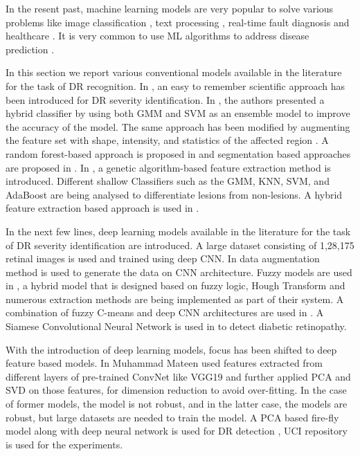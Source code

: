 \documentclass[electronics,article,accept ,moreauthors,pdftex]{mdpi}
\begin{document}
In the resent past, machine learning models are very popular to solve various problems like image classification \cite{bodapati2019feature}, text processing \cite{bodapati2019sentiment}, real-time fault diagnosis \cite{zhuo2018real} and healthcare \cite{xia2020ensemble, moreira2019comprehensive}. It is very common to use ML algorithms to address disease prediction \cite{gadekallu2020deep,patel2020review} \cite{reddy2019hybrid}. 

In this section we report various conventional models available in the literature for the task of DR recognition. In \cite{wu2013classification}, an easy to remember scientific approach has been introduced for DR severity identification. In \cite{akram2013identification}, the authors presented a hybrid classifier by using both GMM and SVM as an ensemble model to improve the accuracy of the model. The same approach has been modified by augmenting the feature set with shape, intensity, and statistics of the affected region \cite{akram2014detection}.  A random forest-based approach is proposed in \cite{casanova2014application} \cite{verma2011detection} and   segmentation based approaches are proposed in \cite{welikala2014automated}. In \cite{welikala2015genetic}, a genetic algorithm-based feature extraction method is introduced. Different shallow Classifiers such as the GMM, KNN, SVM, and AdaBoost are being analysed \cite{roychowdhury2013dream} to differentiate lesions from non-lesions. A hybrid feature extraction based approach is used in \cite{mookiah2013evolutionary}.

In the next few lines, deep learning models available in the literature for the task of DR severity identification are introduced. A large dataset consisting of 1,28,175 retinal images is used and trained using deep CNN. In \cite{porter2019whole} data augmentation method is used to generate the data on CNN architecture. Fuzzy models are used in \cite{rahim2016automatic}, a hybrid model that is designed based on fuzzy logic, Hough Transform and numerous extraction methods are being implemented as part of their system. A combination of fuzzy C-means and deep CNN architectures are used in \cite{dutta2018classification}. A Siamese Convolutional Neural Network is used in \cite{zeng2019automated} to detect diabetic retinopathy.      

With the introduction of deep learning models, focus has been shifted to deep feature based models. In \cite{mateen2019fundus} Muhammad Mateen used features extracted from different layers of pre-trained ConvNet like VGG19 and further applied PCA and SVD on those features, for dimension reduction \cite{9036908} to avoid over-fitting. In the case of former models, the model is not robust, and in the latter case, the models are robust, but large datasets are needed to train the model. A PCA based fire-fly model \cite{bhattacharya2020novel} along with deep neural network is used for DR detection \cite{gadekallu2020early}, UCI repository is used for the experiments.
\end{document}
